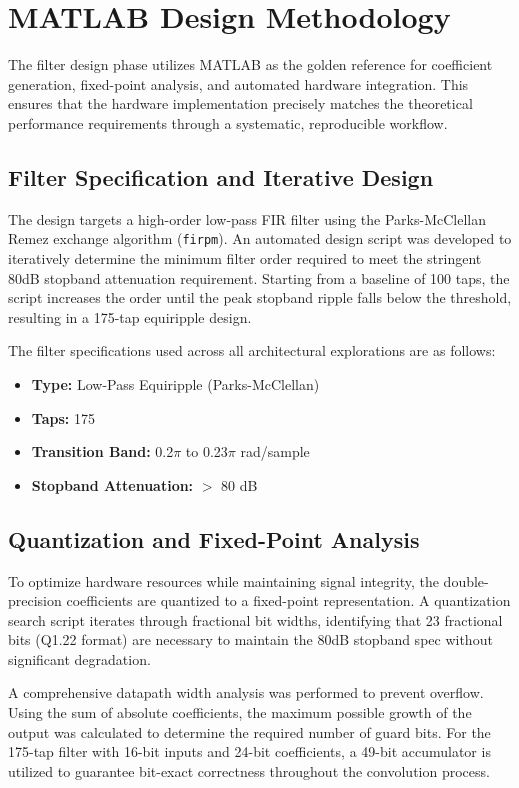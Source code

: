 \documentclass[12pt]{article}
\begin{document}
\section{MATLAB Design Methodology}
The filter design phase utilizes MATLAB as the golden reference for coefficient generation, fixed-point analysis, and automated hardware integration. This ensures that the hardware implementation precisely matches the theoretical performance requirements through a systematic, reproducible workflow.

\subsection{Filter Specification and Iterative Design}
The design targets a high-order low-pass FIR filter using the Parks-McClellan Remez exchange algorithm (\texttt{firpm}). An automated design script was developed to iteratively determine the minimum filter order required to meet the stringent 80dB stopband attenuation requirement. Starting from a baseline of 100 taps, the script increases the order until the peak stopband ripple falls below the threshold, resulting in a 175-tap equiripple design. 

The filter specifications used across all architectural explorations are as follows:
\begin{itemize}
    \item \textbf{Type:} Low-Pass Equiripple (Parks-McClellan)
    \item \textbf{Taps:} 175
    \item \textbf{Transition Band:} 0.2$\pi$ to 0.23$\pi$ rad/sample
    \item \textbf{Stopband Attenuation:} $>$ 80 dB
\end{itemize}

\subsection{Quantization and Fixed-Point Analysis}
To optimize hardware resources while maintaining signal integrity, the double-precision coefficients are quantized to a fixed-point representation. A quantization search script iterates through fractional bit widths, identifying that 23 fractional bits (Q1.22 format) are necessary to maintain the 80dB stopband spec without significant degradation.

A comprehensive datapath width analysis was performed to prevent overflow. Using the sum of absolute coefficients, the maximum possible growth of the output was calculated to determine the required number of guard bits. For the 175-tap filter with 16-bit inputs and 24-bit coefficients, a 49-bit accumulator is utilized to guarantee bit-exact correctness throughout the convolution process.
\end{document}
